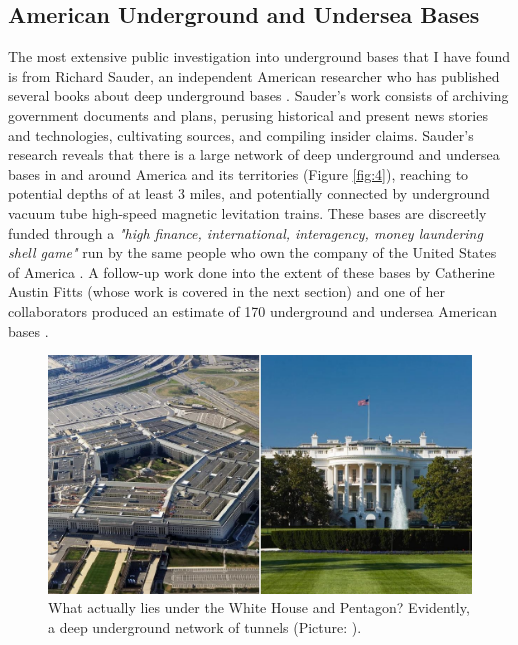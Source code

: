 \documentclass[10pt,twocolumn,letterpaper]{article}
\begin{document}
\subsection{American Underground and Undersea Bases}

The most extensive public investigation into underground bases that I have found is from Richard Sauder, an independent American researcher who has published several books about deep underground bases \cite{22}. Sauder's work consists of archiving government documents and plans, perusing historical and present news stories and technologies, cultivating sources, and compiling insider claims. Sauder's research reveals that there is a large network of deep underground and undersea bases in and around America and its territories (Figure \ref{fig:4}), reaching to potential depths of at least 3 miles, and potentially connected by underground vacuum tube high-speed magnetic levitation trains. These bases are discreetly funded through a \textit{"high finance, international, interagency, money laundering shell game"} run by the same people who own the company of the United States of America \cite{22}. A follow-up work done into the extent of these bases by Catherine Austin Fitts (whose work is covered in the next section) and one of her collaborators produced an estimate of 170 underground and undersea American bases \cite{16,20}.

\begin{figure}[b]
\begin{center}
   \includegraphics[width=1\linewidth]{penta.jpg}
\end{center}
   \caption{What actually lies under the White House and Pentagon? Evidently, a deep underground network of tunnels (Picture: \cite{31}).}
\label{fig:3}
\label{fig:onecol}
\end{figure}
\end{document}
